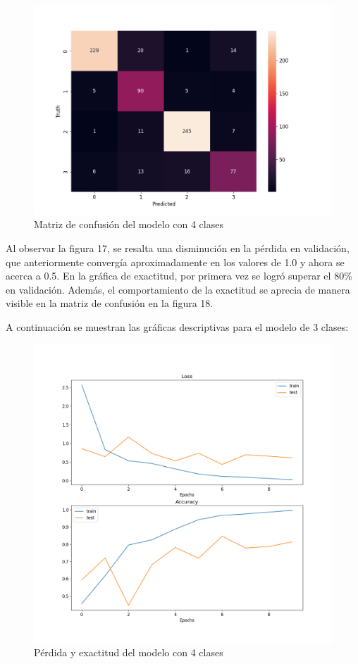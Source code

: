 \begin{figure}[H]
	\centering
	\includegraphics[scale=0.75]{figures/CM4.png}
	\caption{Matriz de confusión del modelo con 4 clases}
	\label{fig:img18}
\end{figure}

Al observar la figura 17, se resalta una disminución en la pérdida en validación, que anteriormente convergía aproximadamente en los valores de 1.0 y ahora se acerca a 0.5. En la gráfica de exactitud, por primera vez se logró superar el 80\% en validación. Además, el comportamiento de la exactitud se aprecia de manera visible en la matriz de confusión en la figura 18.\par

A continuación se muestran las gráficas descriptivas para el modelo de 3 clases:

\begin{figure}[H]
	\centering
	\includegraphics[scale=0.65]{figures/LA5.png}
	\caption{Pérdida y exactitud del modelo con 4 clases}
	\label{fig:img19}
\end{figure}

